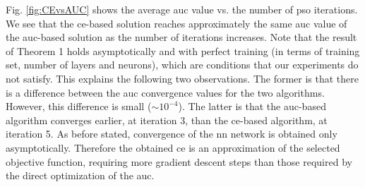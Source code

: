 \documentclass[conference,final]{IEEEtran}
\begin{document}
Fig. \ref{fig:CEvsAUC} shows the average \ac{auc} value vs. the number of \ac{pso} iterations. We see that the \ac{ce}-based solution reaches approximately the same  \ac{auc} value of the \ac{auc}-based solution as the number of iterations increases. 
Note that the result of Theorem 1 holds asymptotically and with perfect training (in terms of training set, number of layers and neurons), which are conditions that our experiments do not satisfy. This explains the following two observations. The former is that there is a  difference between the \ac{auc} convergence values for the two algorithms. However, this difference is small ($\sim 10^{-4}$). The latter is that the \ac{auc}-based algorithm converges earlier, at iteration 3, than the \ac{ce}-based algorithm, at iteration 5. As before stated, convergence of the \ac{nn} network is obtained only asymptotically. Therefore the obtained \ac{ce} is an approximation of the selected objective function, requiring more gradient descent steps than those required by the direct optimization of the \ac{auc}.   

\end{document}
